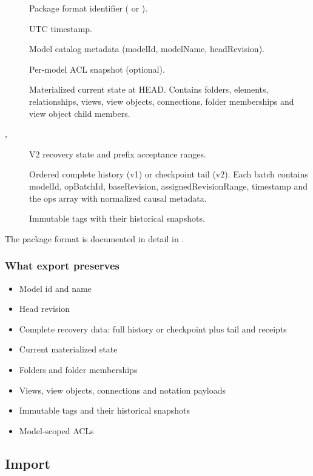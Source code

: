 \begin{description}
\item[] Package format identifier ( or ).
\item[] UTC timestamp.
\item[] Model catalog metadata (modelId, modelName, headRevision).
\item[] Per-model ACL snapshot (optional).
\item[] Materialized current state at HEAD. Contains
  folders, elements, relationships, views, view objects, connections,
  folder memberships and view object child members.
\item[, ] V2 recovery state and prefix acceptance ranges.
\item[] Ordered complete history (v1) or checkpoint tail (v2). Each batch
  contains modelId, opBatchId, baseRevision, assignedRevisionRange,
  timestamp and the ops array with normalized causal metadata.
\item[] Immutable tags with their historical snapshots.
\end{description}

The package format is documented in detail in .

\subsubsection{What export preserves}

\begin{itemize}
\item Model id and name
\item Head revision
\item Complete recovery data: full history or checkpoint plus tail and receipts
\item Current materialized state
\item Folders and folder memberships
\item Views, view objects, connections and notation payloads
\item Immutable tags and their historical snapshots
\item Model-scoped ACLs
\end{itemize}

\subsection{Import}

